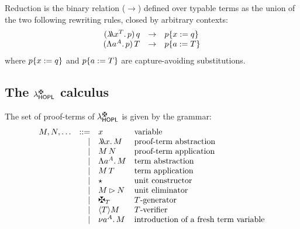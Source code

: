 Reduction is the binary relation ($\to$) defined over typable terms
as the union of the two following rewriting rules,
closed by arbitrary contexts:
\[
  \begin{array}{rcl}
    (\lambda\!\!\lambda{x^{T}}.\,p)\,q
    & \to &
    p\{x:=q\}
  \\
    (\Lambda{a^{A}}.\,p)\,T
    & \to &
    p\{a:=T\}
  \end{array}
\]
where $p\{x:=q\}$ and $p\{a:=T\}$
are capture-avoiding substitutions.

\subsection{The $\lambdaCheckHOPL$ calculus}

The set of proof-terms of $\lambdaCheckHOPL$ is given by the grammar:
\[
  \begin{array}{lrll}
    \utm,\utmtwo,\hdots
  & ::=  & \pvar
         & \text{variable}
  \\
  & \mid & \plam{\pvar}{\utm}
         & \text{proof-term abstraction}
  \\
  & \mid & \utm\,\utmtwo
         & \text{proof-term application}
  \\
  & \mid & \palli{\tvar}{\typ}{\utm}
         & \text{term abstraction}
  \\
  & \mid & \utm\,\ttm
         & \text{term application}
  \\
  & \mid & \iunit
         & \text{unit constructor}
  \\
  & \mid & \eunit{\utm}{\utmtwo}
         & \text{unit eliminator}
  \\
  & \mid & \gen{\ttm}
         & \text{$\ttm$-generator}
  \\
  & \mid & \verif{\ttm}{\utm}
         & \text{$\ttm$-verifier}
  \\
  & \mid & \fresh{\tvar}{\typ}{\utm}
         & \text{introduction of a fresh term variable}
  \end{array}
\]

